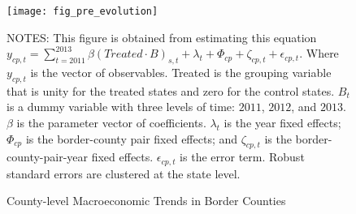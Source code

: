 \begin{figure}[H]
    \centering
    \texttt{[image: fig\_pre\_evolution]}
    \caption{County-level Macroeconomic Trends in Border Counties}
    \label{fig:county-level-macroeconomic-trends-in-border-counties}
    \begin{minipage}{14cm}
        \vspace{0.05in}
        \tiny NOTES: This figure is obtained from estimating this equation $y_{cp,t} = \sum_{t = 2011}^{2013} \beta (Treated \cdot B)_{s,t} + \lambda_{t} + \Phi_{cp} + \zeta_{cp,t} + \epsilon_{cp,t}$. Where $y_{cp,t}$ is the vector of observables. Treated is the grouping variable that is unity for the treated states and zero for the control states. $B_{t}$ is a dummy variable with three levels of time: $2011$, $2012$, and $2013$. $\beta$ is the parameter vector of coefficients. $\lambda_{t}$ is the year fixed effects; $\Phi_{cp}$ is the border-county pair fixed effects; and $\zeta_{cp,t}$ is the border-county-pair-year fixed effects. $\epsilon_{cp,t}$ is the error term. Robust standard errors are clustered at the state level.
    \end{minipage}
\end{figure}